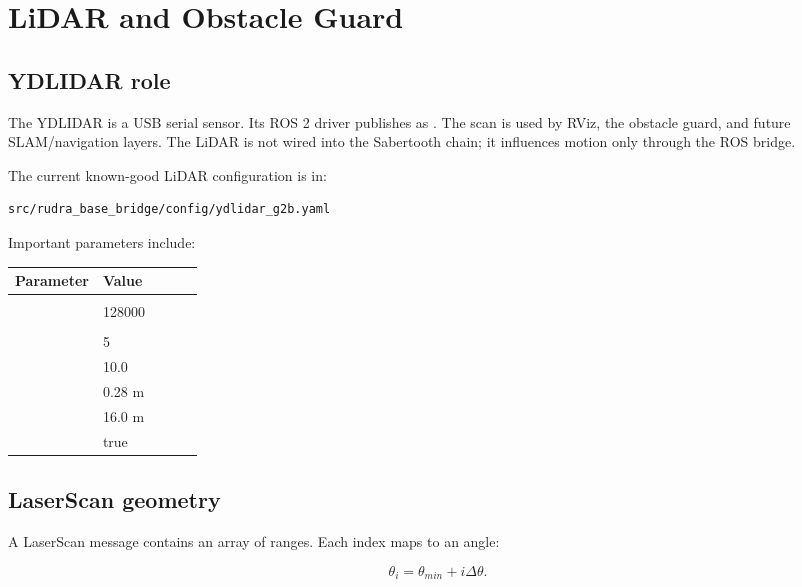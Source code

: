 \chapter{LiDAR and Obstacle Guard}

\section{YDLIDAR role}

The YDLIDAR is a USB serial sensor. Its ROS 2 driver publishes  as . The scan is used by RViz, the obstacle guard, and future SLAM/navigation layers. The LiDAR is not wired into the Sabertooth chain; it influences motion only through the ROS bridge.

The current known-good LiDAR configuration is in:

\begin{lstlisting}[language=bash]
src/rudra_base_bridge/config/ydlidar_g2b.yaml
\end{lstlisting}

Important parameters include:

\begin{center}
\small
\begin{tabularx}{\linewidth}{p{0.22\linewidth}Y}
\toprule
Parameter & Value\\
\midrule
{} & \\
 & 128000\\
 & \\
 & 5\\
 & 10.0\\
 & 0.28 m\\
 & 16.0 m\\
 & true\\
\bottomrule
\end{tabularx}
\end{center}

\section{LaserScan geometry}

A LaserScan message contains an array of ranges. Each index maps to an angle:

\begin{equation}
\theta_i=\theta_{min}+i\Delta\theta.
\end{equation}


